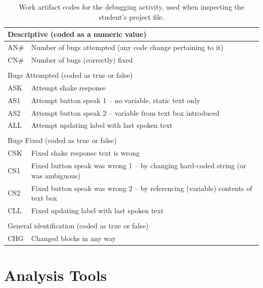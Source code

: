\begin{table}
\begin{centering}
	\begin{tabular}{lp{13cm}}
	\multicolumn{2}{l}{Descriptive (coded as a numeric value)} 	\\ \hline
	AN\# 	& Number of bugs attempted (any code change pertaining to it)	\\
	CN\#	& Number of bugs (correctly) fixed														\\
	\\

	\multicolumn{2}{l}{Bugs Attempted (coded as true or false)} 	\\ \hline
	ASK 	& Attempt shake response	\\
	AS1		& Attempt button speak 1 -- no variable, static text only					\\
	AS2		& Attempt button speak 2 -- variable from text box introduced		\\
	ALL		& Attempt updating label with last spoken text											\\
	\\

	\multicolumn{2}{l}{Bugs Fixed (coded as true or false)} 	\\ \hline
	CSK 	& Fixed shake response text is wrong	\\
	CS1		& Fixed button speak was wrong 1 -- by changing hard-coded string (or was ambiguous)	\\
	CS2		& Fixed button speak was wrong 2 -- by referencing (variable) contents of text box	\\
	CLL		& Fixed updating label with last spoken text											\\
	\\

	\multicolumn{2}{l}{General identification (coded as true or false)} 	\\ \hline
	CHG 	& Changed blocks in any way	\\

	\end{tabular}
	\caption[Work artifact codes for debugging activity]{Work artifact codes for the debugging activity, used when inspecting the student's project file.}
	\label{tab:debug-artifact-codes}
\end{centering}
\end{table}


\section{Analysis Tools} \label{sec:analysis-tools}


